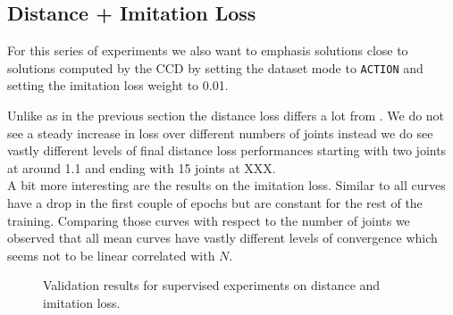 \subsection{Distance + Imitation Loss}

For this series of experiments we also want to emphasis solutions close to solutions computed by the CCD by setting the dataset mode to \texttt{ACTION} and setting the imitation loss weight to 0.01. 

Unlike as in the previous section the distance loss differs a lot from . We do not see a steady increase in loss over different numbers of joints instead we do see vastly different levels of final distance loss performances starting with two joints at around 1.1 and ending with 15 joints at XXX.\\
A bit more interesting are the results on the imitation loss. Similar to  all curves have a drop in the first couple of epochs but are constant for the rest of the training. Comparing those curves with respect to the number of joints we observed that all mean curves have vastly different levels of convergence which seems not to be linear correlated with $N$.


\begin{figure}
    \begin{center}
        \hfill
    \end{center}
    \caption[Supervised Distance and Imitation Loss]{Validation results for supervised experiments on distance and imitation loss. }
    \label{fig:supervised_imitation}
\end{figure}

